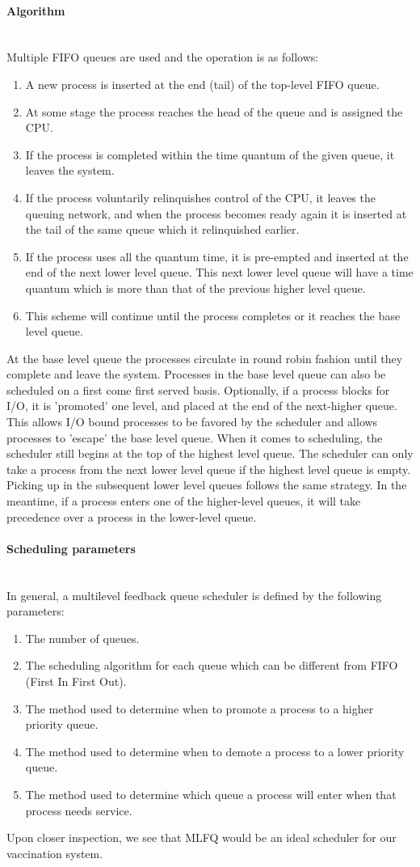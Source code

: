 \documentclass[10pt,twocolumn,letterpaper]{article}
\newcommand{\subsubsubsection}[1]{\paragraph{#1}\mbox{}\\}
\begin{document}
\subsubsubsection{Algorithm}
Multiple FIFO queues are used and the operation is as follows:
\begin{enumerate}
	\item A new process is inserted at the end (tail) of the top-level FIFO queue.
	\item At some stage the process reaches the head of the queue and is assigned the CPU.
	\item If the process is completed within the time quantum of the given queue, it leaves the system.
	\item If the process voluntarily relinquishes control of the CPU, it leaves the queuing network, and when the process becomes ready again it is inserted at the tail of the same queue which it relinquished earlier.
	\item If the process uses all the quantum time, it is pre-empted and inserted at the end of the next lower level queue. This next lower level queue will have a time quantum which is more than that of the previous higher level queue.
	\item This scheme will continue until the process completes or it reaches the base level queue.
\end{enumerate}
At the base level queue the processes circulate in round robin fashion until they complete and leave the system. Processes in the base level queue can also be scheduled on a first come first served basis. Optionally, if a process blocks for I/O, it is 'promoted' one level, and placed at the end of the next-higher queue. This allows I/O bound processes to be favored by the scheduler and allows processes to 'escape' the base level queue. When it comes to scheduling, the scheduler still begins at the top of the highest level queue. The scheduler can only take a process from the next lower level queue if the highest level queue is empty. Picking up in the subsequent lower level queues follows the same strategy. In the meantime, if a process enters one of the higher-level queues, it will take precedence over a process in the lower-level queue.

\subsubsubsection{Scheduling parameters}
In general, a multilevel feedback queue scheduler is defined by the following parameters:
\begin{enumerate}
	\item The number of queues.
	\item The scheduling algorithm for each queue which can be different from FIFO (First In First Out).
	\item The method used to determine when to promote a process to a higher priority queue.
	\item The method used to determine when to demote a process to a lower priority queue.
	\item The method used to determine which queue a process will enter when that process needs service.
\end{enumerate}
Upon closer inspection, we see that MLFQ would be an ideal scheduler for our vaccination system.
\end{document}
